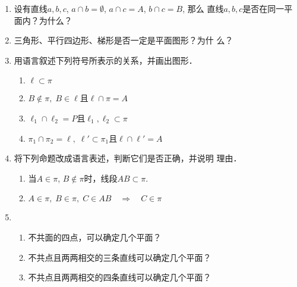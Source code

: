 \begin{enumerate}
  \item 设有直线$a,b,c$, $a\cap b=\emptyset$, $a\cap c=A$, $b\cap c=B$, 那么
直线$a,b,c$是否在同一平面内？为什么？
\item 三角形、平行四边形、梯形是否一定是平面图形？为什
么？
\item 用语言叙述下列符号所表示的关系，并画出图形．
\begin{enumerate}
  \item $\ell\subset \pi$
  \item $B\notin \pi,\; B\in \ell$且$\ell\cap\pi=A$
  \item $\ell_1\cap \ell_2=P$且$\ell_1,\ell_2\subset \pi$
  \item $\pi_1\cap \pi_2=\ell,\; \ell'\subset \pi_1$且$\ell\cap \ell'=A$
\end{enumerate}


\item 将下列命题改成语言表述，判断它们是否正确，并说明
理由．
\begin{enumerate}
  \item 当$A\in \pi$, $B\notin \pi$时，线段$AB\subset \pi$.
  \item $A\in\pi,\; B\in\pi,\; C\in AB\quad \Rightarrow\quad C\in\pi $
\end{enumerate}

\item 
\begin{enumerate}
  \item 不共面的四点，可以确定几个平面？
  \item 不共点且两两相交的三条直线可以确定几个平面？
  \item 不共点且两两相交的四条直线可以确定几个平面？
\end{enumerate}


\end{enumerate}

